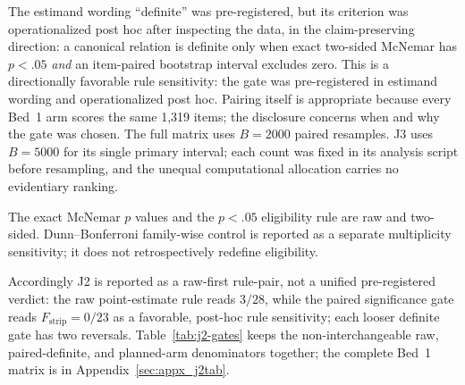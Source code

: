 \documentclass{article}
\begin{document}
The estimand wording ``definite'' was pre-registered, but its criterion was
operationalized post hoc after inspecting the data, in the claim-preserving direction:
a canonical relation is definite only when exact two-sided McNemar has
$p<.05$ \emph{and} an item-paired bootstrap interval excludes zero.  This is a
directionally favorable rule sensitivity: the gate was pre-registered in
estimand wording and operationalized post hoc.  Pairing itself is appropriate
because every Bed~1 arm scores the same 1,319 items; the disclosure concerns
when and why the gate was chosen.  The full matrix uses $B=2000$ paired
resamples.  J3 uses $B=5000$ for its single primary interval; each count was
fixed in its analysis script before resampling, and the unequal computational
allocation carries no evidentiary ranking.

The exact McNemar $p$ values and the $p<.05$ eligibility rule are raw and
two-sided.  Dunn--Bonferroni family-wise control is reported as a separate
multiplicity sensitivity; it does not retrospectively redefine eligibility.

Accordingly J2 is reported as a raw-first rule-pair, not a unified
pre-registered verdict: the raw point-estimate rule reads $3/28$, while the
paired significance gate reads $F_{\mathrm{strip}}=0/23$ as a
favorable, post-hoc rule sensitivity; each looser definite gate has two
reversals.  Table~\ref{tab:j2-gates} keeps the non-interchangeable raw,
paired-definite, and planned-arm denominators together; the complete Bed~1
matrix is in Appendix~\ref{sec:appx_j2tab}.
\end{document}
